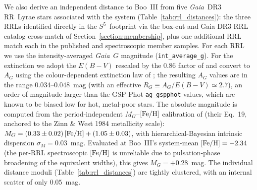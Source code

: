 \documentclass[twocolumn]{aastex631}
\newcommand{\SSSSS}{${S}^5$\xspace}
\newcommand{\gaia}{\textit{Gaia}\xspace}
\begin{document}
We also derive an independent distance to Boo~III from five \gaia~DR3 RR~Lyrae stars associated with the system (Table~\ref{tab:rrl_distances}): the three RRLs identified directly in the \SSSSS\ footprint via the box-cut and Gaia DR3 RRL catalog cross-match of Section~\ref{section:membership}, plus one additional RRL match each in the published \citet{Carlin2018} and \citet{Geha2026} spectroscopic member samples. For each RRL we use the intensity-averaged \gaia~$G$ magnitude (\texttt{int\_average\_g}). For the extinction we adopt the \citet{Schlegel1998} $E(B-V)$ rescaled by the $0.86$ factor of \citet{Schlafly2011} and convert to $A_G$ using the colour-dependent extinction law of \citet{Babusiaux2018}; the resulting $A_G$ values are in the range 0.034--0.048~mag (with an effective $R_G \equiv A_G/E(B-V)\simeq 2.7$), an order of magnitude larger than the GSP-Phot \texttt{ag\_gspphot} values, which are known to be biased low for hot, metal-poor stars. The absolute magnitude is computed from the period-independent $M_G$--$[{\rm Fe/H}]$ calibration of \citet{Garofalo2022} (their Eq.~19, anchored to the Zinn \& West 1984 metallicity scale): $M_G = (0.33 \pm 0.02)\,[{\rm Fe/H}] + (1.05 \pm 0.03)$, with hierarchical-Bayesian intrinsic dispersion $\sigma_M = 0.03$~mag. Evaluated at Boo~III's system-mean $[{\rm Fe/H}] = -2.34$ (the per-RRL spectroscopic $[{\rm Fe/H}]$ is unreliable due to pulsation-phase broadening of the equivalent widths), this gives $M_G = +0.28$~mag. The individual distance moduli (Table~\ref{tab:rrl_distances}) are tightly clustered, with an internal scatter of only $0.05$~mag.
\end{document}
